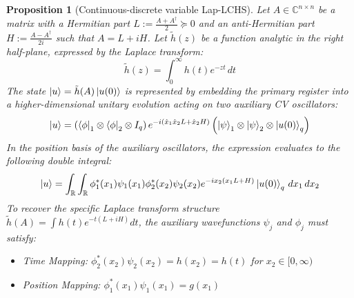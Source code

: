 \documentclass{article}
\newtheorem{proposition}{Proposition}
\begin{document}
\begin{proposition}[Continuous-discrete variable Lap-LCHS]
    Let $A \in \mathbb{C}^{n \times n}$ be a matrix with a Hermitian part $L:= \frac{A + A^{\dagger}}{2} \succeq 0$ and an anti-Hermitian part $H:=\frac{A - A^{\dagger}}{2i}$ such that $A = L + iH$.
    Let $\tilde h(z)$ be a function analytic in the right half-plane, expressed by the Laplace transform:
        $$\tilde{h}(z) = \int_{0}^{\infty} h(t) e^{-zt} \, dt$$
    The state $\ket{u} = \tilde{h}(A)\ket{u(0)}$ is represented by embedding the primary register into a higher-dimensional unitary evolution acting on two auxiliary CV oscillators:    
    \begin{align}
        \ket{u} = \left( \bra{\phi}_{1} \otimes \bra{\phi}_{2} \otimes I_q \right) e^{-i(\hat{x}_1 \hat{x}_2 L + \hat{x}_2  H)} \left( \ket{\psi}_{1} \otimes \ket{\psi}_{2} \otimes \ket{u(0)}_q \right)
    \end{align}
    In the position basis of the auxiliary oscillators, the expression evaluates to the following double integral:
    \begin{align}
        \ket{u} = \int_{\mathbb{R}} \int_{\mathbb{R}} \phi_1^*(x_1) \psi_1(x_1) \phi_2^*(x_2) \psi_2(x_2) e^{-ix_2(x_1 L + H)}  \ket{u(0)}_q \, dx_1 \, dx_2 
    \end{align}
    To recover the specific Laplace transform structure $\tilde h(A) = \int h(t) e^{-t(L+iH)} dt$, the auxiliary wavefunctions $\psi_j$ and $\phi_j$ must satisfy:
    \begin{itemize}
        \item Time Mapping: $\phi_2^*(x_2)\psi_2(x_2)=h(x_2)=h(t)$ for $x_2\in [0,\infty)$
        \item Position Mapping: $\phi_1^*(x_1) \psi_1(x_1) = g(x_1)$ 
    \end{itemize}
\end{proposition}
\end{document}
